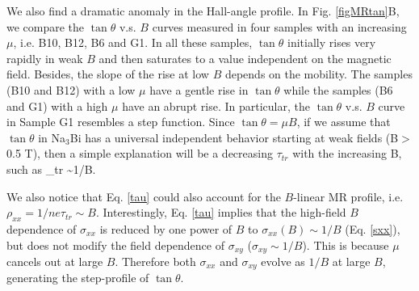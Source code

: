 We also find a dramatic anomaly in the Hall-angle profile. In Fig. \ref{figMRtan}B, we compare the $\tan\theta$ v.s. $B$ curves measured in four samples with an increasing $\mu$, i.e. B10, B12, B6 and G1. In all these samples, $\tan\theta$ initially rises very rapidly in weak $B$ and then saturates to a value independent on the magnetic field. Besides, the slope of the rise at low $B$ depends on the mobility. The samples (B10 and B12) with a low $\mu$ have a gentle rise in $\tan\theta$ while the samples (B6 and G1) with a high $\mu$ have an abrupt rise. In particular, the $\tan\theta$ v.s. $B$ curve in Sample G1 resembles a step function. Since $\tan\theta = \mu B$, if we assume that $\tan\theta$ in Na$_3$Bi has a universal independent behavior starting at weak fields (B$>$0.5 T), then a simple explanation will be a decreasing $\tau_{tr}$ with the increasing B, such as 
\be
\tau_{tr} \sim 1/B.
\label{tau}
\ee



We also notice that Eq. \ref{tau} could also account for the $B$-linear MR profile, i.e. 
$\rho_{xx} = 1/ne\tau_{tr} \sim B.$
Interestingly, Eq. \ref{tau} implies that the high-field $B$ dependence of $\sigma_{xx}$ is reduced by one power of $B$ to $\sigma_{xx}(B)\sim 1/B$ (Eq. \ref{sxx}), but does not modify the field dependence of $\sigma_{xy}$ ($\sigma_{xy}\sim 1/B$). This is because $\mu$ cancels out at large $B$. Therefore both $\sigma_{xx}$ and $\sigma_{xy}$ evolve as $1/B$ at large $B$, generating the step-profile of $\tan\theta$. 

